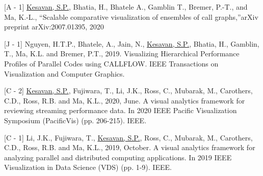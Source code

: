 


\begin{cvparagraph}

 [A - 1] \underline{Kesavan, S.P.}, Bhatia, H., Bhatele A., Gamblin T., Bremer, P.-T., and Ma, K.-L., “Scalable comparative visualization of ensembles of call graphs,”arXiv preprint arXiv:2007.01395, 2020
 


 [J - 1] Nguyen, H.T.P., Bhatele, A., Jain, N., \underline{Kesavan, S.P.}, Bhatia, H., Gamblin, T., Ma, K.L. and Bremer, P.T., 2019. Visualizing Hierarchical Performance Profiles of Parallel Codes using CALLFLOW. IEEE Transactions on Visualization and Computer Graphics.
 

 [C - 2] \underline{Kesavan, S.P.}, Fujiwara, T., Li, J.K., Ross, C., Mubarak, M., Carothers, C.D., Ross, R.B. and Ma, K.L., 2020, June. A visual analytics framework for reviewing streaming performance data. In 2020 IEEE Pacific Visualization Symposium (PacificVis) (pp. 206-215). IEEE.
 
 [C - 1] Li, J.K., Fujiwara, T., \underline{Kesavan, S.P.}, Ross, C., Mubarak, M., Carothers, C.D., Ross, R.B. and Ma, K.L., 2019, October. A visual analytics framework for analyzing parallel and distributed computing applications. In 2019 IEEE Visualization in Data Science (VDS) (pp. 1-9). IEEE.
\end{cvparagraph}
